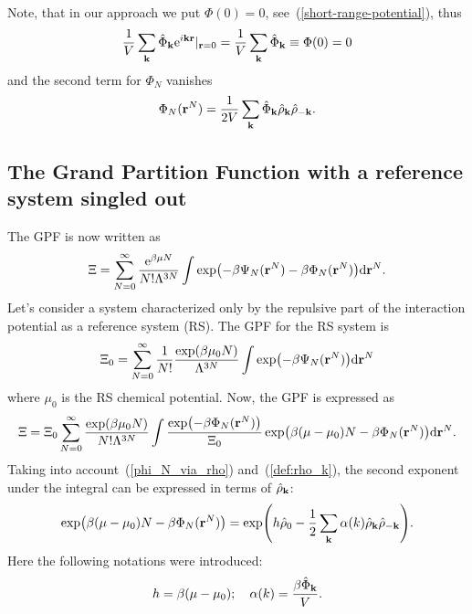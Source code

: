 Note, that in our approach we put $\Phi(0) = 0$, see~(\ref{short-range-potential}), thus $$\frac{1}{V}\sum_{\vb k} \hat{\Phi}_{\vb k}{\rm e}^{i\vb k \vb r}|_{\vb r=0} = \frac{1}{V}\sum_{\vb k} \hat{\Phi}_{\vb k} \equiv \Phi(0) = 0$$
and the second term for $\Phi_N$ vanishes
\begin{equation}
	\label{phi_N_via_rho}
	\Phi_N(\vb r^N) = \frac{1}{2V} \sum_{\vb k} \hat{\Phi}_{\vb k} \hat{\rho}_{\vb k} \hat{\rho}_{-\vb k}.
\end{equation}

\subsection{The Grand Partition Function with a reference system singled out}

The GPF is now written as
\begin{equation}
	\Xi = \sum_{N=0}^{\infty}\frac{{\rm e}^{\beta\mu N}}{N!\Lambda^{3N}} \int \exp(-\beta\Psi_N(\vb r^N) - \beta\Phi_N(\vb r^N)) {\rm d} {\vb r}^N.
\end{equation}
Let's consider a system characterized only by the repulsive part of the interaction potential as a reference system (RS). The GPF for the RS system is
\begin{equation}
	\label{def:GPF_0}
	\Xi_0 = \sum_{N=0}^{\infty} \frac{1}{N!} \frac{\exp(\beta\mu_0 N)}{\Lambda^{3N}} \int \exp(-\beta\Psi_N(\vb r^N)) {\rm d} {\vb r}^N
\end{equation}
where $\mu_0$ is the RS chemical potential.
Now, the GPF is expressed as
\begin{equation}
	\Xi = \Xi_0 \sum_{N=0}^{\infty} \frac{\exp(\beta\mu_0 N)}{N! \Lambda^{3N}} \int \frac{\exp(-\beta \Phi_N (\vb r^N))}{\Xi_0} \exp(\beta(\mu - \mu_0)N - \beta\Phi_N(\vb r^N)) {\rm d} {\vb r^N}.
	\nonumber
\end{equation}
Taking into account~(\ref{phi_N_via_rho}) and~(\ref{def:rho_k}), the second exponent under the integral can be expressed in terms of $\hat{\rho}_{\vb k}$:
\begin{equation}
	\label{exp_attr}
	\exp(\beta(\mu - \mu_0)N - \beta\Phi_N(\vb r^N)) = \exp(h\hat{\rho}_0 - \frac{1}{2} \sum_{\vb k} \alpha(k) \hat{\rho}_{\vb k} \hat{\rho}_{-\vb k} ).
\end{equation}
Here the following notations were introduced:
\begin{equation}
	\label{def:h}
	h = \beta (\mu - \mu_0); \quad \alpha(k) = \frac{\beta\hat{\Phi}_{\vb k}}{V}.
\end{equation}

